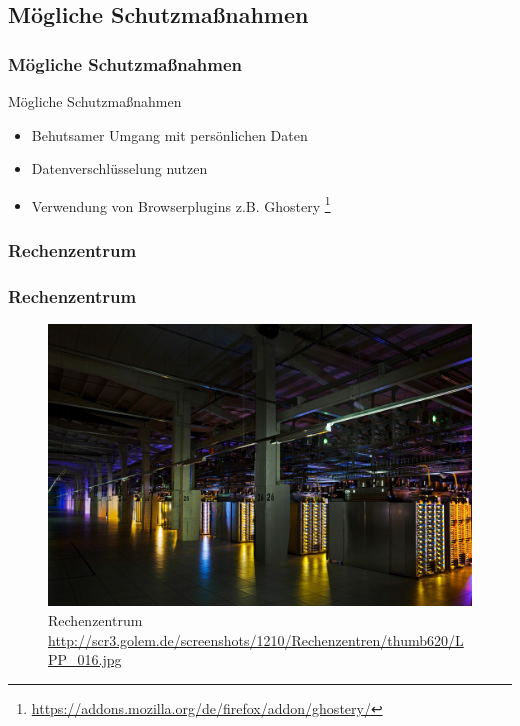 \documentclass[xcolor=dvipsnames]{beamer}
\begin{document}
\subsection{Mögliche Schutzmaßnahmen}
\begin{frame} %
  \frametitle{Mögliche Schutzmaßnahmen} %
  \begin{block}{Mögliche Schutzmaßnahmen}
	  \begin{itemize}
	  	\item Behutsamer Umgang mit persönlichen Daten
	  	\item Datenverschlüsselung nutzen
	  	\item Verwendung von Browserplugins z.B. Ghostery \footnote{\url{https://addons.mozilla.org/de/firefox/addon/ghostery/}}
	  \end{itemize}
  \end{block}
\end{frame}

\subsubsection{Rechenzentrum}
\begin{frame}
  \frametitle{Rechenzentrum}
	\begin{figure}
		\includegraphics[scale=0.1]{LPP_016.jpg}
		\caption{Rechenzentrum \\ \tiny{\textcolor{gray}{\url{http://scr3.golem.de/screenshots/1210/Rechenzentren/thumb620/LPP_016.jpg}}}}
		\end{figure}
\end{frame}
\end{document}
